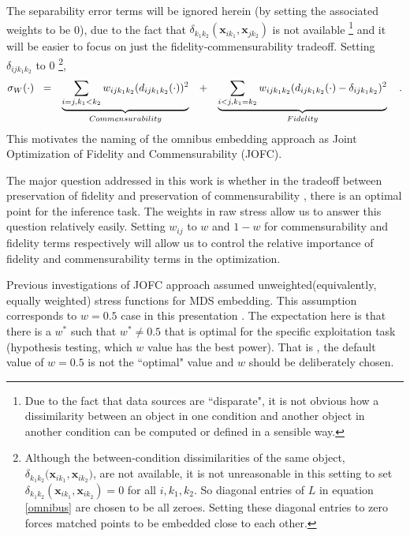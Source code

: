 \documentclass[11pt]{article} %
\begin{document}
 The separability error terms will be ignored herein (by setting the associated weights  to be 0), due to the fact that 
$\delta_{k_1k_2}(\bm{x}_{ik_1},\bm{x}_{jk_2})$ is not  available \footnote{Due to the fact that data sources are ``disparate", it is not obvious how  a dissimilarity between an object in one condition and another object in another condition  can be computed or  defined in a sensible way.} and it will be easier to focus on just the fidelity-commensurability tradeoff. Setting $\delta_{ijk_1k_2}$ to 0 \footnote{Although  the between-condition dissimilarities of the same object, ${ \delta_{k_1k_2}(\bm{x}_{ik_1},\bm{x}_{ik_2}})$, are not available,  it is not unreasonable in this setting  to set ${ \delta_{k_1k_2}}(\bm{x}_{ik_1},\bm{x}_{ik_2}) = 0$ for all $i,k_1,k_2$.  So diagonal  entries of $L$ in  equation \eqref{omnibus} are  chosen to be all zeroes. Setting these diagonal entries to zero forces matched points to be embedded close to each other.},
\begin{align}
\sigma_W(\cdot)\hspace{3pt}   
\hspace{3pt}&=&\underbrace{\sum_{i=j,k_1< k_2}  {w_{ij{k_1}{k_2}}(d_{ij{k_1}{k_2}}(\cdot))^2}}_{Commensurability}  \hspace{10pt}  &  +&\underbrace{\sum_{i< j,k_1=k_2}  {w_{ij{k_1}{k_2}}(d_{ij{k_1}{k_2}}(\cdot)-\delta_{ijk_1k_2})^2  }  } _{Fidelity}\notag\label{eq:FidCommSep}\hspace{10pt} .
\end{align}
This motivates  the naming of the   omnibus embedding approach as Joint Optimization of Fidelity and Commensurability (JOFC).

The major question  addressed in this work is whether in the tradeoff between preservation of fidelity and preservation of  commensurability , there is an optimal point for the inference task.  The weights in raw stress allow us to answer this question relatively easily. Setting $w_{ij}$ to $w$ and $1-w$  for commensurability  and fidelity  terms respectively will allow us to control the relative importance of fidelity and commensurability terms in the optimization. 

Previous investigations of JOFC approach assumed unweighted(equivalently, equally weighted) stress functions for MDS embedding. This assumption corresponds to  $w=0.5$ case in this presentation .
The expectation here is that there is a $w^*$   such that  $w^* \neq 0.5$  that is optimal for the specific exploitation task (hypothesis testing, which $w$ value has the best power). That is , the default value of $w=0.5$  is not the ``optimal" value and $w$ should be deliberately chosen.
\end{document}
